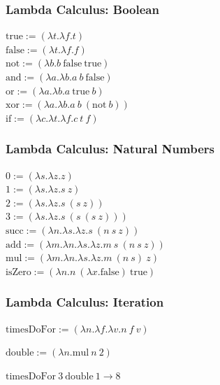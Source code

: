 \documentclass{beamer}
\begin{document}
\begin{frame}[fragile]
  \frametitle{Lambda Calculus: Boolean}

  $ \text{true} := (\lambda t . \lambda f . t) $ \\
  $ \text{false} := (\lambda t . \lambda f . f) $ \\


  $ \text{not} := (\lambda b . b\ \text{false}\ \text{true}) $ \\
  $ \text{and} := (\lambda a . \lambda b . a\ b\ \text{false}) $ \\
  $ \text{or} := (\lambda a . \lambda b . a\ \text{true}\ b) $ \\
  $ \text{xor} := (\lambda a . \lambda b . a\ b\ (\text{not}\ b)) $ \\

  $ \text{if} := (\lambda c . \lambda t . \lambda f . c\ t\ f) $ \\
\end{frame}

\begin{frame}[fragile]
  \frametitle{Lambda Calculus: Natural Numbers}
  $ 0 := (\lambda s . \lambda z . z) $ \\
  $ 1 := (\lambda s . \lambda z . s\ z) $ \\
  $ 2 := (\lambda s . \lambda z . s\ (s\ z)) $ \\
  $ 3 := (\lambda s . \lambda z . s\ (s\ (s\ z))) $ \\

  $ \text{succ} := (\lambda n . \lambda s . \lambda z . s\ (n\ s\ z)) $ \\

  $ \text{add} := (\lambda m . \lambda n . \lambda s . \lambda z . m\ s\ (n\ s\ z)) $ \\
  $ \text{mul} := (\lambda m . \lambda n . \lambda s . \lambda z . m\ (n\ s)\ z) $ \\

  $ \text{isZero} := (\lambda n . n\ (\lambda x . \text{false})\ \text{true}) $ \\
\end{frame}

\begin{frame}[fragile]
  \frametitle{Lambda Calculus: Iteration}

  $ \text{timesDoFor} := (\lambda n. \lambda f.\lambda v. n\ f\ v) $

  $ \text{double} := (\lambda n. \text{mul}\ n\ 2) $

  $ \text{timesDoFor}\ 3\ \text{double}\ 1 \rightarrow 8$

\end{frame}
\end{document}
